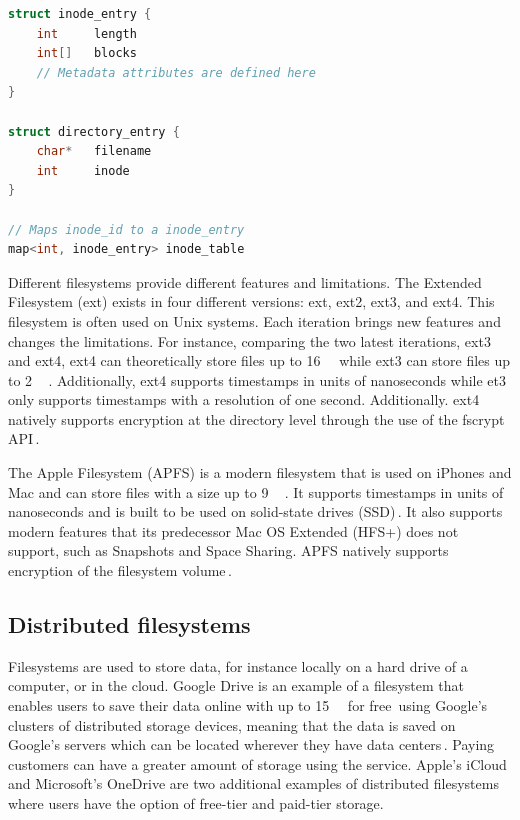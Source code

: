 \begin{minipage}{\linewidth}
\begin{lstlisting}[language=c, caption={Pseudocode of a minimalistic inode filesystem structure}, label=lst:inode_fs]
struct inode_entry {
	int 	length
	int[]	blocks
	// Metadata attributes are defined here
}

struct directory_entry {
	char*   filename
	int     inode
}

// Maps inode_id to a inode_entry
map<int, inode_entry> inode_table

\end{lstlisting}
\end{minipage}

Different filesystems provide different features and limitations. The Extended Filesystem (ext) exists in four different versions: ext, ext2, ext3, and ext4. This filesystem is often used on Unix systems. Each iteration brings new features and changes the limitations. For instance, comparing the two latest iterations, ext3 and ext4, ext4 can theoretically store files up to \SI{16}{\tebi\byte} while ext3 can store files up to \SI{2}{\tebi\byte}\,\cite{salterUnderstandingLinuxFilesystems2018}. Additionally, ext4 supports timestamps in units of nanoseconds while et3 only supports timestamps with a resolution of one second. Additionally. ext4 natively supports encryption at the directory level through the use of the fscrypt API\,\cite{FscryptArchWiki}.

The Apple Filesystem (APFS) is a modern filesystem that is used on iPhones and Mac and can store files with a size up to \SI{9}{\exa\byte}\,\cite{APFSAppleFile2017}. It supports timestamps in units of nanoseconds and is built to be used on solid-state drives (SSD)\,\cite{nelsonWhatAPFSDoes}. It also supports modern features that its predecessor Mac OS Extended (HFS+) does not support, such as Snapshots and Space Sharing. APFS natively supports encryption of the filesystem volume\,\cite{appleinc.FileSystemFormats}.

\subsection{Distributed filesystems}
Filesystems are used to store data, for instance locally on a hard drive of a computer, or in the cloud. Google Drive is an example of a filesystem that enables users to save their data online with up to \SI{15}{\giga\byte} for free\,\cite{CloudStorageWork} using Google's clusters of distributed storage devices, meaning that the data is saved on Google's servers which can be located wherever they have data centers\,\cite{DistributedStorageWhat}. Paying customers can have a greater amount of storage using the service. Apple's iCloud and Microsoft's OneDrive are two additional examples of distributed filesystems where users have the option of free-tier and paid-tier storage.

